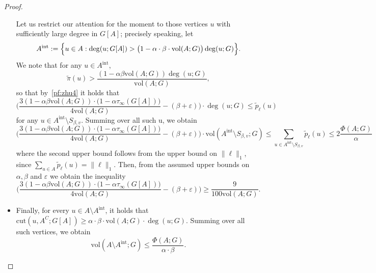 \documentclass{report}
\newcommand{\vol}{\mathrm{vol}}
\newcommand{\1}{\mathbf{1}}
\newcommand{\wt}[1]{\widetilde{#1}}
\theoremstyle{alden}
\theoremstyle{aldenthm}
\theoremstyle{definition}
\theoremstyle{remark}
\begin{document}
\begin{proof}
\begin{itemize}
		Let us restrict our attention for the moment to those vertices $u$ with sufficiently large degree in $G[A]$; precisely speaking, let
		\begin{equation*}
		A^{\mathrm{int}} := \Bigl\{u \in A: \deg(u;G[A]) > \bigl(1 - \alpha \cdot \beta \cdot \vol(A;G)\bigr) \deg(u;G) \Bigr\}.
		\end{equation*}
		We note that for any $u \in A^{\mathrm{int}}$,
		\begin{equation*}
		\wt{\pi}(u) > \frac{(1 - \alpha \beta \vol(A;G))\deg(u;G)}{\vol(A;G)},
		\end{equation*}
		so that by~\eqref{pf:zhu4} it holds that
		\begin{equation*}
		\biggl(\frac{3(1 - \alpha \beta \vol(A;G))\cdot\bigl(1 - \alpha \tau_{\infty}(G[A])\bigr)}{4\vol(A;G)} - (\beta + \varepsilon)\biggr) \cdot \deg(u;G) \leq \wt{p}_{\ell}(u)
		\end{equation*}
		for any $u \in A^{\mathrm{int}} \setminus S_{\beta,v}$. Summing over all such u, we obtain
		\begin{equation*}
		\biggl(\frac{3(1 - \alpha \beta \vol(A;G))\cdot\bigl(1 - \alpha \tau_{\infty}(G[A])\bigr)}{4\vol(A;G)} - (\beta + \varepsilon)\biggr) \cdot \vol(A^{\mathrm{int}} \setminus S_{\beta,v}; G) \leq \sum_{u \in A^{\mathrm{int}} \setminus S_{\beta,v}} \wt{p}_{\ell}(u) \leq 2\frac{\Phi(A;G)}{\alpha}
		\end{equation*}
		where the second upper bound follows from the upper bound on $\|\ell\|_1$, since $\sum_{u \in A} \wt{p}_{\ell}(u) = \|\ell\|_1$. 
		Then, from the assumed upper bounds on $\alpha, \beta$ and $\varepsilon$ we obtain the inequality
		\begin{equation*}
		\biggl(\frac{3(1 - \alpha \beta \vol(A;G))\cdot\bigl(1 - \alpha \tau_{\infty}(G[A])\bigr)}{4\vol(A;G)} - (\beta + \varepsilon)\biggr) \geq \frac{9}{100\vol(A;G)}.
		\end{equation*}
		\item Finally, for every $u \in A \setminus A^{\mathrm{int}} $, it holds that $\mathrm{cut}(u, A^C;G[A]) \geq \alpha \cdot \beta \cdot \vol(A;G) \cdot \deg(u;G)$. Summing over all such vertices, we obtain
		\begin{equation*}
		\vol(A \setminus A^{\mathrm{int}};G) \leq \frac{\Phi(A;G)}{\alpha \cdot \beta}.
		\end{equation*}	
	\end{itemize}
\end{proof}
\end{document}
